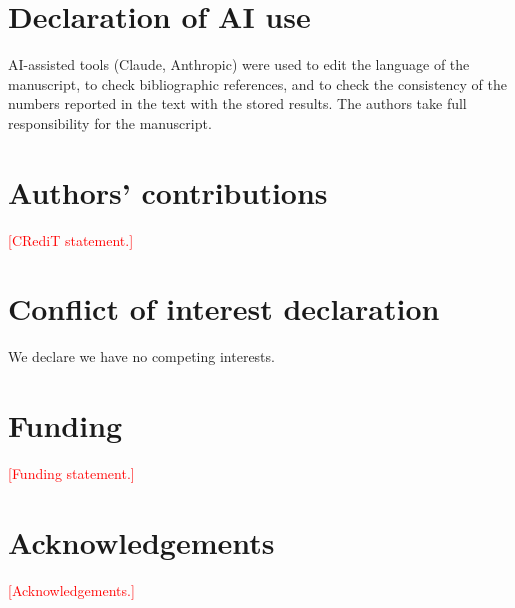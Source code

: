 \documentclass[11pt,a4paper]{article}
\newcommand{\todo}[1]{\textcolor{red}{[#1]}}
\begin{document}
\section*{Declaration of AI use}
AI-assisted tools (Claude, Anthropic) were used to edit the language of the manuscript, to check bibliographic references, and to check the consistency of the numbers reported in the text with the stored results. The authors take full responsibility for the manuscript.

\section*{Authors' contributions}
\todo{CRediT statement.}

\section*{Conflict of interest declaration}
We declare we have no competing interests.

\section*{Funding}
\todo{Funding statement.}

\section*{Acknowledgements}
\todo{Acknowledgements.}



\end{document}
